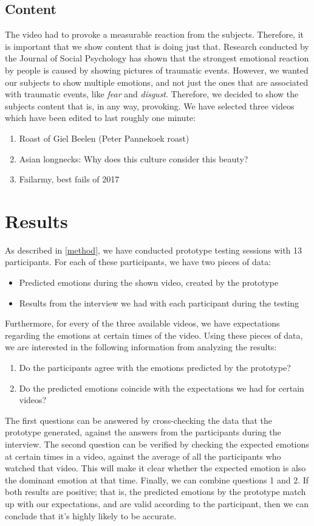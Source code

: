\documentclass[sigconf]{acmart}
\begin{document}
\subsection{Content}
The video had to provoke a measurable reaction from the subjects. Therefore, it is important that we show content
that is doing just that. Research conducted by the Journal of Social Psychology \cite{leary2015seemingly}
has shown that the strongest emotional reaction by people is caused by showing pictures of traumatic events.
However, we wanted our subjects to show multiple emotions, and not just the ones that are associated with
traumatic events, like \emph{fear} and \emph{disgust}. Therefore, we decided to show the subjects content
that is, in any way, provoking. We have selected three videos which have been edited to last roughly one minute:
\begin{enumerate}
    \item{Roast of Giel Beelen (Peter Pannekoek roast)}
    \item{Asian longnecks: Why does this culture consider this beauty?}
    \item{Failarmy, best fails of 2017}
\end{enumerate}


\section{Results}
As described in \ref{method}, we have conducted prototype testing sessions with 13 participants. For each of these
participants, we have two pieces of data:
\begin{itemize}
    \item{Predicted emotions during the shown video, created by the prototype}
    \item{Results from the interview we had with each participant during the testing}
\end{itemize}
Furthermore, for every of the three available videos, we have expectations regarding the emotions at certain
times of the video. Using these pieces of data, we are interested in the following information from analyzing
the results:
\begin{enumerate}
    \item{Do the participants agree with the emotions predicted by the prototype?}
    \item{Do the predicted emotions coincide with the expectations we had for certain videos?}
\end{enumerate}
The first questions can be answered by cross-checking the data that the prototype generated, against the
answers from the participants during the interview. The second question can be verified by checking the
expected emotions at certain times in a video, against the average of all the participants who watched that
video. This will make it clear whether the expected emotion is also the dominant emotion at that time.
Finally, we can combine questions 1 and 2. If both results are positive; that is, the predicted emotions by the
prototype match up with our expectations, and are valid according to the participant, then we can conclude
that it's highly likely to be accurate.
\end{document}
